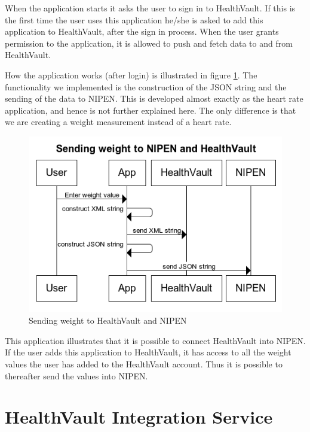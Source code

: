 When the application starts it asks the user to sign in to HealthVault.
If this is the first time the user uses this application he/she is asked to add this application to HealthVault,
after the sign in process.
When the user grants permission to the application, it is allowed to push and fetch data to and from HealthVault.

How the application works (after login) is illustrated in figure \ref{figure:sending-weight-to-healthvault-and-nipen}.
The functionality we implemented is the construction of the JSON string and the sending of the data to NIPEN.
This is developed almost exactly as the heart rate application, and hence is not further explained here.
The only difference is that we are creating a weight measurement instead of a heart rate.

\begin{figure}[h]
\centering
\includegraphics[scale=1.0]{../Figures/sending-weight-to-healthvault-and-nipen.png}
\caption{Sending weight to HealthVault and NIPEN}
\label{figure:sending-weight-to-healthvault-and-nipen}
\end{figure}

This application illustrates that it is possible to connect HealthVault into NIPEN.
If the user adds this application to HealthVault, it has access to all the weight values the user has added to the HealthVault account.
Thus it is possible to thereafter send the values into NIPEN.

\section{HealthVault Integration Service}

